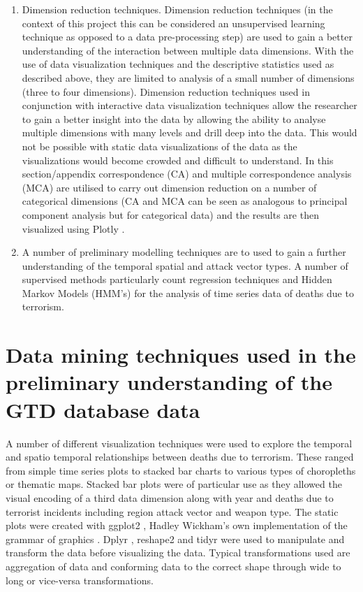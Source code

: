 \begin{enumerate}
\item Dimension reduction techniques. Dimension reduction techniques (in the context of this project this can be considered an unsupervised learning technique as opposed to a data pre-processing step) are used to gain a better understanding of the interaction between multiple data dimensions. With the use of data visualization techniques and the descriptive statistics used as described above, they are limited to analysis of a small number of dimensions (three to four dimensions). Dimension reduction techniques used in conjunction with interactive data visualization techniques allow the researcher to gain a better insight into the data by allowing the ability to analyse multiple dimensions with many levels and drill deep into the data. This would not be possible with static data visualizations of the data as the visualizations would become crowded and difficult to understand. In this section/appendix correspondence (CA) and multiple correspondence analysis (MCA) \citep{factominer2008} are utilised to carry out dimension reduction on a number of categorical dimensions (CA and MCA can be seen as analogous to principal component analysis but for categorical data) and the results are then visualized using Plotly \citep{plotlymanual2016}. 
\item A number of preliminary modelling techniques are to used to gain a further understanding of the temporal spatial and attack vector types. A number of supervised methods particularly count regression techniques and Hidden Markov Models (HMM's) for the analysis of time series data of deaths due to terrorism.  
\end{enumerate}

\section{Data mining techniques used in the preliminary understanding of the GTD database data}
\label{sec:chap4dataprep}

A number of different visualization techniques were used to explore the temporal and spatio temporal relationships between deaths due to terrorism.  These ranged from simple time series plots to stacked bar charts to various types of choropleths or thematic maps. Stacked bar plots were of particular use as they allowed the visual encoding of a third data dimension along with year and deaths due to terrorist incidents including region attack vector and weapon type. The static plots were created with ggplot2 \citep{ggplotwickham2009}, Hadley Wickham's own implementation of the grammar of graphics \citep{wilkinson2006grammar}. Dplyr \citep{dplyr2016wickham}, reshape2 \citep{reshape2007wickham} and tidyr \citep{tidyr2916Wickham} were used to manipulate and transform the data before visualizing the data. Typical transformations used are aggregation of data and conforming data to the correct shape through wide to long or vice-versa transformations.


